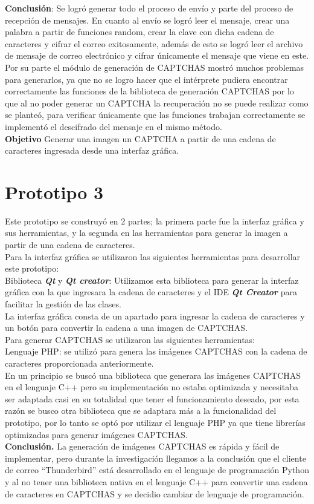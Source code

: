 \documentclass[12pt,oneside,onecolumn,openany]{report}
\begin{document}
\textbf{Conclusión}:
Se logró generar todo el proceso de envío y parte del proceso de recepción de mensajes. En cuanto al envío se logró leer el mensaje, crear una palabra a partir de funciones random, crear la clave con dicha cadena de caracteres y cifrar el correo exitosamente, además de esto se logró leer el archivo de mensaje de correo electrónico y cifrar únicamente el mensaje que viene en este.\\
Por su parte el módulo de generación de CAPTCHAS mostró muchos problemas para generarlos, ya que no se logro hacer que el intérprete pudiera encontrar correctamente las funciones de la biblioteca de generación CAPTCHAS por lo que al no poder generar un CAPTCHA la recuperación no se puede realizar como se planteó, para verificar únicamente que las funciones trabajan correctamente se implementó el descifrado del mensaje en el mismo método.\\


\textbf{Objetivo}
Generar una imagen un CAPTCHA a partir de una cadena de caracteres ingresada desde una interfaz gráfica.
\section{Prototipo 3}
Este prototipo se construyó en 2 partes; la primera parte fue la interfaz gráfica y sus herramientas, y la segunda en las herramientas para generar la imagen a partir de una cadena de caracteres.\\
Para la interfaz gráfica se utilizaron las siguientes herramientas para desarrollar este prototipo:\\
Biblioteca \textbf{\textit{Qt}} y \textbf{\textit{Qt creator}}: Utilizamos esta biblioteca para generar la interfaz gráfica con la que ingresara la cadena de caracteres y el IDE \textbf{\textit{Qt Creator}} para facilitar la gestión de las clases.\\
La interfaz gráfica consta de un apartado para ingresar la cadena de caracteres y un botón para convertir la cadena a una imagen de CAPTCHAS.\\
Para generar CAPTCHAS se utilizaron las siguientes herramientas:\\
Lenguaje PHP: se utilizó para genera las imágenes CAPTCHAS con la cadena de caracteres proporcionada anteriormente.\\
En un principio se buscó una biblioteca que generara las imágenes CAPTCHAS en el lenguaje C++ pero su implementación no estaba optimizada y necesitaba ser adaptada casi en su totalidad que tener el funcionamiento deseado, por esta razón se busco otra biblioteca que se adaptara más a la funcionalidad del prototipo, por lo tanto se optó por utilizar el lenguaje PHP ya que tiene librerías optimizadas para generar imágenes CAPTCHAS.\\
\textbf{Conclusión.}
La generación de imágenes CAPTCHAS es rápida y fácil de implementar, pero durante la investigación llegamos a la conclusión que el cliente de correo “Thunderbird” está desarrollado en el lenguaje de programación Python y al no tener una biblioteca nativa en el lenguaje C++ para convertir una cadena de caracteres en CAPTCHAS y  se decidio cambiar de lenguaje de programación.\\
\end{document}
